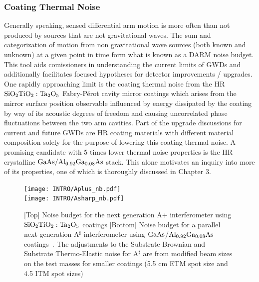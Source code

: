 \subsubsection{Coating Thermal Noise}\label{subsubsec:introctn}
Generally speaking, sensed differential arm motion is more often than not produced by sources that are not gravitational waves. The sum and categorization of motion from non gravitational wave sources (both known and unknown) at a given point in time form what is known as a DARM noise budget. This tool aids comissioners in understanding the current limits of GWDs and additionally facilitates focused hypotheses for detector improvements / upgrades. One rapidly approaching limit is the coating thermal noise from the HR $\mathrm{SiO_2}\mathrm{TiO_2:Ta_2O_5}$ Fabry-P\'erot cavity mirror coatings which arises from the mirror surface position observable influenced by energy dissipated by the coating by way of its acoustic degrees of freedom and causing uncorrelated phase fluctuations between the two arm cavities. Part of the upgrade discussions for current and future GWDs are HR coating materials with different material composition solely for the purpose of lowering this coating thermal noise. A promising candidate with 5 times lower thermal noise properties is the HR crystalline $\mathrm{GaAs}/\mathrm{Al_{0.92}Ga_{0.08}As}$ stack. This alone motivates an inquiry into more of its properties, one of which is thoroughly discussed in Chapter 3.   

\begin{figure}[ht!]
    \centering
    \begin{subcaptiongroup}
		\texttt{[image: INTRO/Aplus\_nb.pdf]}
		\\
		\texttt{[image: INTRO/Asharp\_nb.pdf]}
    \end{subcaptiongroup}
    \hfill
    \caption{[Top] Noise budget for the next generation A+ interferometer using $\mathrm{SiO_2}\mathrm{TiO_2:Ta_2O_5}$ coatings [Bottom] Noise budget for a parallel next generation A$^\sharp$ interferometer using $\mathrm{GaAs}$/$\mathrm{Al_{0.92}Ga_{0.08}As}$ coatings~\cite{dcc:asharp}. The adjustments to the Substrate Brownian and Substrate Thermo-Elastic noise for A$^\sharp$ are from modified beam sizes on the test masses for smaller coatings (5.5 cm ETM spot size and 4.5 ITM spot sizes) ~\cite{kuns:priv_comm}}
\label{fig:aplusasharp}
\end{figure}


